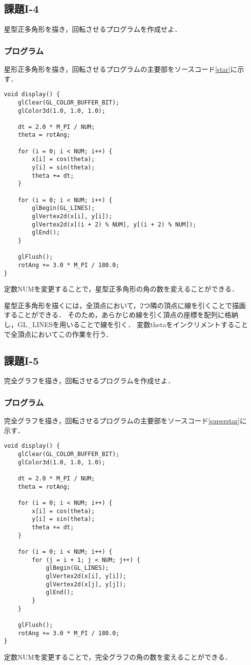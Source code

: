 \documentclass[]{jarticle}
\begin{document}
\subsection{課題I-4}
星型正多角形を描き，回転させるプログラムを作成せよ．
\subsubsection{プログラム}
星形正多角形を描き，回転させるプログラムの主要部をソースコード\ref{star}に示す．
\begin{lstlisting}[caption=星形正多角形の描画と回転,label=star]
void display() {
    glClear(GL_COLOR_BUFFER_BIT);
    glColor3d(1.0, 1.0, 1.0);

    dt = 2.0 * M_PI / NUM;
    theta = rotAng;
    
    for (i = 0; i < NUM; i++) {
        x[i] = cos(theta);
        y[i] = sin(theta);
        theta += dt;
    }

    for (i = 0; i < NUM; i++) {
        glBegin(GL_LINES);
        glVertex2d(x[i], y[i]);
        glVertex2d(x[(i + 2) % NUM], y[(i + 2) % NUM]);
        glEnd();
    }

    glFlush();
    rotAng += 3.0 * M_PI / 180.0;
}
\end{lstlisting}
定数NUMを変更することで，星型正多角形の角の数を変えることができる．

星型正多角形を描くには，全頂点において，2つ隣の頂点に線を引くことで描画することができる．
そのため，あらかじめ線を引く頂点の座標を配列に格納し，GL\_LINESを用いることで線を引く．
変数thetaをインクリメントすることで全頂点においてこの作業を行う．

\subsection{課題I-5}
完全グラフを描き，回転させるプログラムを作成せよ．
\subsubsection{プログラム}
完全グラフを描き，回転させるプログラムの主要部をソースコード\ref{superstar}に示す．
\begin{lstlisting}[caption=完全グラフの描画と回転,label=superstar]
void display() {
    glClear(GL_COLOR_BUFFER_BIT);
    glColor3d(1.0, 1.0, 1.0);

    dt = 2.0 * M_PI / NUM;
    theta = rotAng;

    for (i = 0; i < NUM; i++) {
        x[i] = cos(theta);
        y[i] = sin(theta);
        theta += dt;
    }

    for (i = 0; i < NUM; i++) {
        for (j = i + 1; j < NUM; j++) {
            glBegin(GL_LINES);
            glVertex2d(x[i], y[i]);
            glVertex2d(x[j], y[j]);
            glEnd();
        }
    }

    glFlush();
    rotAng += 3.0 * M_PI / 180.0;
}
\end{lstlisting}
定数NUMを変更することで，完全グラフの角の数を変えることができる．
\end{document}

